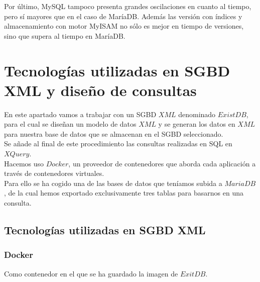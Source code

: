 \documentclass[12pt,a4paper]{article}
\begin{document}
Por último, MySQL tampoco presenta grandes oscilaciones en cuanto al tiempo, pero sí mayores que en el caso de MaríaDB. Además las versión con índices y almacenamiento con motor MyISAM no sólo es mejor en tiempo de versiones, sino que supera al tiempo en MaríaDB.\\






\newpage
\mbox{}
\newpage

\section{Tecnologías utilizadas en SGBD XML y diseño de consultas} \label{pto4} 

En este apartado vamos a trabajar con un SGBD $XML$ denominado $ExistDB$, para el cual se diseñan un modelo de datos $XML$ y se generan los datos en $XML$ para nuestra base de datos que se almacenan en el SGBD seleccionado. \\

Se añade al final de este procedimiento las consultas realizadas en SQL en $XQuery$.\\

Hacemos uso $Docker$, un proveedor de contenedores que aborda cada aplicación a través de contenedores virtuales.\\

Para ello se ha cogido una de las bases de datos que teníamos subida a $MariaDB$ , de la cual hemos exportado exclusivamente tres tablas para basarnos en una consulta. 

\subsection{Tecnologías utilizadas en SGBD XML}  \label{pto41}



\subsubsection{Docker} Como contenedor en el que se ha guardado la imagen de $ExitDB$. \label{pto411}
\end{document}
